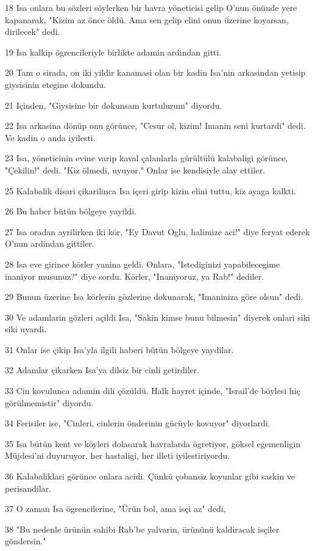 \par 18 Isa onlara bu sözleri söylerken bir havra yöneticisi gelip O'nun önünde yere kapanarak, "Kizim az önce öldü. Ama sen gelip elini onun üzerine koyarsan, dirilecek" dedi.
\par 19 Isa kalkip ögrencileriyle birlikte adamin ardindan gitti.
\par 20 Tam o sirada, on iki yildir kanamasi olan bir kadin Isa'nin arkasindan yetisip giysisinin etegine dokundu.
\par 21 Içinden, "Giysisine bir dokunsam kurtulurum" diyordu.
\par 22 Isa arkasina dönüp onu görünce, "Cesur ol, kizim! Imanin seni kurtardi" dedi. Ve kadin o anda iyilesti.
\par 23 Isa, yöneticinin evine varip kaval çalanlarla gürültülü kalabaligi görünce, "Çekilin!" dedi. "Kiz ölmedi, uyuyor." Onlar ise kendisiyle alay ettiler.
\par 25 Kalabalik disari çikarilinca Isa içeri girip kizin elini tuttu, kiz ayaga kalkti.
\par 26 Bu haber bütün bölgeye yayildi.
\par 27 Isa oradan ayrilirken iki kör, "Ey Davut Oglu, halimize aci!" diye feryat ederek O'nun ardindan gittiler.
\par 28 Isa eve girince körler yanina geldi. Onlara, "Istediginizi yapabilecegime inaniyor musunuz?" diye sordu. Körler, "Inaniyoruz, ya Rab!" dediler.
\par 29 Bunun üzerine Isa körlerin gözlerine dokunarak, "Imaniniza göre olsun" dedi.
\par 30 Ve adamlarin gözleri açildi Isa, "Sakin kimse bunu bilmesin" diyerek onlari siki siki uyardi.
\par 31 Onlar ise çikip Isa'yla ilgili haberi bütün bölgeye yaydilar.
\par 32 Adamlar çikarken Isa'ya dilsiz bir cinli getirdiler.
\par 33 Cin kovulunca adamin dili çözüldü. Halk hayret içinde, "Israil'de böylesi hiç görülmemistir" diyordu.
\par 34 Ferisiler ise, "Cinleri, cinlerin önderinin gücüyle kovuyor" diyorlardi.
\par 35 Isa bütün kent ve köyleri dolasarak havralarda ögretiyor, göksel egemenligin Müjdesi'ni duyuruyor, her hastaligi, her illeti iyilestiriyordu.
\par 36 Kalabaliklari görünce onlara acidi. Çünkü çobansiz koyunlar gibi saskin ve perisandilar.
\par 37 O zaman Isa ögrencilerine, "Ürün bol, ama isçi az" dedi,
\par 38 "Bu nedenle ürünün sahibi Rab'be yalvarin, ürününü kaldiracak isçiler göndersin."

